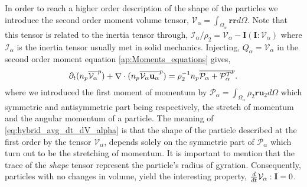 In order to reach a higher order description of the shape of the particles we introduce the second order moment volume tensor,  $\mathcal{V}_\alpha = \int_{\Omega_\alpha} \textbf{rr} d\Omega$. 
Note that this tensor is related to the inertia tensor through, $\mathcal{I}_\alpha/\rho_2 = \mathcal{V}_\alpha - \textbf{I}(\textbf{I}:\mathcal{V}_\alpha)$
where $\mathcal{I}_\alpha$ is the inertia tensor usually met in solid mechanics. 
Injecting, $Q_\alpha = \mathcal{V}_\alpha$ in the second order moment equation \ref{ap:Moments_equations} gives, 
\begin{equation}
        \partial_t (n_p\overline{\mathcal{V}_\alpha}^{p})
    + \mathbf{\nabla} \cdot (
        n_p\overline{\mathcal{V}_\alpha\textbf{u}_\alpha}^{p}
        )
    = \rho_2^{-1}n_p\overline{\mathcal{P}_\alpha+\mathcal{P}_\alpha^T}^{p}.
    \label{eq:hybrid_avg_dt_dV_alpha}
\end{equation}
where we introduced the first moment of momentum by $\mathcal{P}_\alpha = \int_{\Omega_\alpha} \rho_2\textbf{ru}_2 d\Omega$ which symmetric and antisymmetric part being respectively, the stretch of momentum and the angular momentum of a particle. 
The meaning of \ref{eq:hybrid_avg_dt_dV_alpha} is that the shape of the particle described at the first order by the tensor $\mathcal{V}_\alpha$, depends solely on the symmetric part of $\mathcal{P}_\alpha$ which turn out to be the stretching of momentum.  
It is important to mention that the trace of the \textit{shape} tensor represent the particle's radius of gyration.
Consequently, particles with no changes in volume, yield the interesting property, $\frac{d}{d t} \mathcal{V}_\alpha : \textbf{I} = 0$.


